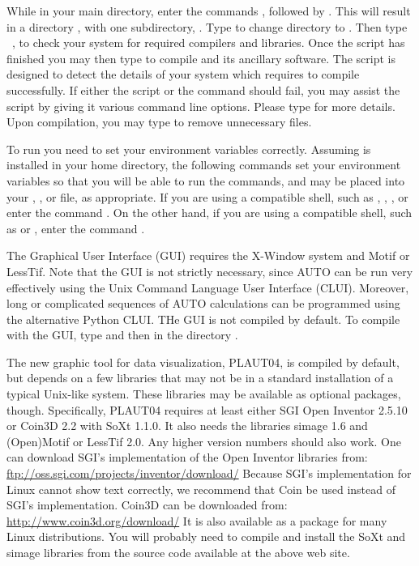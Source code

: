 \documentclass[12pt]{report}
\begin{document}
While in your main directory, enter the commands
,
followed by .
This will result in a directory , 
with one subdirectory, . 
Type 
to change directory to .
Then type
~,
to check your system for required compilers and libraries.
Once the  script has finished you 
may then type  to compile \AUTO
and its ancillary software.
The  script is designed to detect the details
of your system which \AUTO requires to compile successfully.
If either the  script or the  command
should fail, you may assist the  script by giving
it various command line options.  Please type 
for more details.
Upon compilation, you may type 
to remove unnecessary files.

To run \AUTO you need to set your environment variables correctly.
Assuming \AUTO is installed in your home directory, the following
commands set your environment variables so that you will be able to
run the \AUTO commands, and may be placed into your ,
, or  file, as appropriate.  If you are
using a  compatible shell, such as ,
, , or  enter the command
.  On the
other hand, if you are using a  compatible shell, such
as  or , enter the command .

The Graphical User Interface (GUI) requires the {\cal X-Window} system
and {\cal Motif} or {\cal LessTif}.
Note that the GUI is not strictly necessary, since {\cal AUTO} can be
run very effectively using the Unix Command Language User Interface (CLUI).
Moreover, long or complicated sequences of {\cal AUTO} calculations can
be programmed using the alternative Python CLUI. 
THe GUI is not compiled by default. To compile
\AUTO with the GUI, type 
and then  in the directory .

The new graphic tool for \AUTO data visualization, PLAUT04, is
compiled by default, but depends on a few libraries that may not be
in a standard installation of a typical Unix-like
system. These libraries may be available as optional packages,
though. Specifically, PLAUT04 requires at least either SGI Open
Inventor 2.5.10 or Coin3D 2.2 with SoXt 1.1.0. It also needs the
libraries simage 1.6 and (Open)Motif or LessTif 2.0. Any higher
version numbers should also work.
One can download SGI's implementation of the Open Inventor libraries from:
\url{ftp://oss.sgi.com/projects/inventor/download/}
Because SGI's implementation for Linux cannot show text correctly, 
we recommend that Coin be used instead of SGI's implementation. 
Coin3D can be downloaded from:
\url{http://www.coin3d.org/download/}
It is also available as a package for many Linux distributions.
You will probably need to compile and install the SoXt and simage
libraries from the source code available at the above web site.
\end{document}
